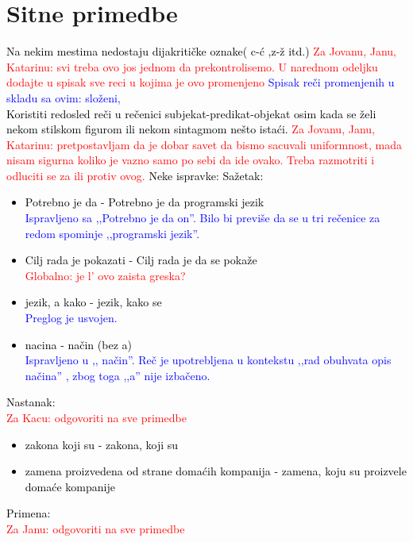 \documentclass[a4paper]{report}
\newcommand{\odgovor}[1]{\textcolor{black}{#1}}
\newcommand{\odgovorAutora}[1]{\textcolor{blue}{#1}}
\newcommand{\note}[1]{\textcolor{red}{#1}}
\begin{document}
\section{Sitne primedbe}
\odgovor{
Na nekim mestima nedostaju dijakritičke oznake( c-ć ,z-ž itd.)
\note{Za Jovanu, Janu, Katarinu: svi treba ovo jos jednom da prekontrolisemo. U narednom odeljku dodajte u spisak sve reci u kojima je ovo promenjeno} \odgovorAutora{Spisak reči promenjenih u skladu sa ovim: složeni, } \\
Koristiti redosled reči u rečenici subjekat-predikat-objekat osim kada se želi nekom stilskom figurom ili nekom sintagmom nešto istaći.
\note{Za Jovanu, Janu, Katarinu: pretpostavljam da je dobar savet da bismo sacuvali uniformnost, mada nisam sigurna koliko je vazno samo po sebi da ide ovako. Treba razmotriti i odluciti se za ili protiv ovog.}\newline
Neke ispravke:\newline
Sažetak:
\begin{itemize}
  \item Potrebno je da - Potrebno je da programski jezik \\
  \odgovorAutora{Ispravljeno sa ,,Potrebno je da on''. Bilo bi previše da se u tri rečenice za redom spominje ,,programski jezik''.}
  \item Cilj rada je pokazati - Cilj rada je da se pokaže \\
  \note{Globalno: je l' ovo zaista greska?}
  \item  jezik, a kako  -  jezik, kako se \\
  \odgovorAutora{Preglog je usvojen.}
  \item  nacina - način (bez a) \\
  \odgovorAutora{Ispravljeno u ,, način''. Reč je upotrebljena u kontekstu ,,rad obuhvata opis načina'' , zbog toga ,,a'' nije izbačeno.}
\end{itemize}
Nastanak: \\
\note{Za Kacu: odgovoriti na sve primedbe} 
\begin{itemize}
  \item zakona koji su - zakona, koji su
  \item zamena proizvedena od strane domaćih kompanija - zamena, koju su proizvele domaće kompanije
\end{itemize}
Primena: \\
\note{Za Janu: odgovoriti na sve primedbe} 
\begin{itemize}

\end{itemize}}
\end{document}
